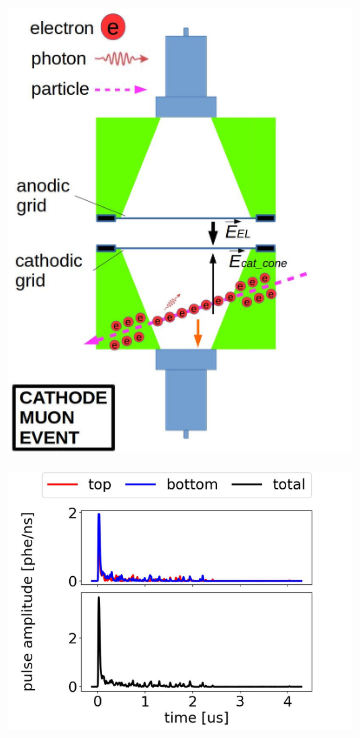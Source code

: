 \begin{figure}[!htbp]
	\centering
		\begin{subfigure}[b]{.8\textwidth}
		\centering
		\includegraphics[width=\halfwidth,clip,trim={0 0 0 0},angle=0,origin=c]{Figures/GasTest/WeiDrawEvent/CathodeMuonEvent.jpg}
		\caption{}
		\label{fig:cathode muon a}
	\end{subfigure}
\par\bigskip
	\begin{subfigure}[b]{0.7\textwidth}
		\centering
		\includegraphics[width=\figurewidth,clip,trim={0 0 0 0}]{Figures/GasTest/exampleWaveforms/proc64767id00000007.jpg}%

\end{subfigure}
\end{figure}
